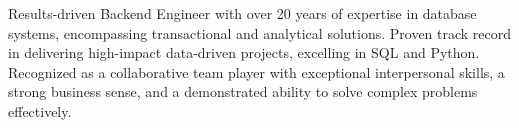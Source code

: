 
\bigskip
\begin{cvparagraph}

Results-driven Backend Engineer with over 20 years of expertise in database systems, encompassing transactional and analytical solutions. Proven track record in delivering high-impact data-driven projects, excelling in SQL and Python. Recognized as a collaborative team player with exceptional interpersonal skills, a strong business sense, and a demonstrated ability to solve complex problems effectively.

\end{cvparagraph}